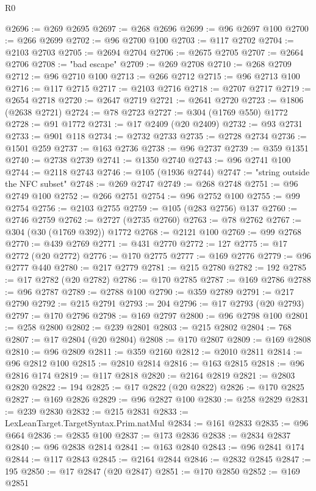 \begin{lexlean}{R0}
\begin{coremodule}
@2696 := @269 @2695
@2697 := @268 @2696
@2699 := @96 @2697 @100
@2700 := @266 @2699
@2702 := @96 @2700 @100
@2703 := @117 @2702
@2704 := @2103 @2703
@2705 := @2694 @2704
@2706 := @2675 @2705
@2707 := @2664 @2706
@2708 := "bad escape"
@2709 := @269 @2708
@2710 := @268 @2709
@2712 := @96 @2710 @100
@2713 := @266 @2712
@2715 := @96 @2713 @100
@2716 := @117 @2715
@2717 := @2103 @2716
@2718 := @2707 @2717
@2719 := @2654 @2718
@2720 := @2647 @2719
@2721 := @2641 @2720
@2723 := @1806 (@2638 @2721)
@2724 := @78 @2723
@2727 := @304 (@1769 @550) @1772
@2728 := @91 @1772
@2731 := @17 @2409 (@20 @2409)
@2732 := @93 @2731
@2733 := @901 @118
@2734 := @2732 @2733
@2735 := @2728 @2734
@2736 := @1501 @259
@2737 := @163 @2736
@2738 := @96 @2737
@2739 := @359 @1351
@2740 := @2738 @2739
@2741 := @1350 @2740
@2743 := @96 @2741 @100
@2744 := @2118 @2743
@2746 := @105 (@1936 @2744)
@2747 := "string outside the NFC subset"
@2748 := @269 @2747
@2749 := @268 @2748
@2751 := @96 @2749 @100
@2752 := @266 @2751
@2754 := @96 @2752 @100
@2755 := @99 @2754
@2756 := @2103 @2755
@2759 := @105 (@283 @2756) @137
@2760 := @2746 @2759
@2762 := @2727 (@2735 @2760)
@2763 := @78 @2762
@2767 := @304 (@30 (@1769 @392)) @1772
@2768 := @2121 @100
@2769 := @99 @2768
@2770 := @439 @2769
@2771 := @431 @2770
@2772 := 127
@2775 := @17 @2772 (@20 @2772)
@2776 := @170 @2775
@2777 := @169 @2776
@2779 := @96 @2777 @440
@2780 := @217 @2779
@2781 := @215 @2780
@2782 := 192
@2785 := @17 @2782 (@20 @2782)
@2786 := @170 @2785
@2787 := @169 @2786
@2788 := @96 @2787
@2789 := @2788 @100
@2790 := @359 @2789
@2791 := @217 @2790
@2792 := @215 @2791
@2793 := 204
@2796 := @17 @2793 (@20 @2793)
@2797 := @170 @2796
@2798 := @169 @2797
@2800 := @96 @2798 @100
@2801 := @258 @2800
@2802 := @239 @2801
@2803 := @215 @2802
@2804 := 768
@2807 := @17 @2804 (@20 @2804)
@2808 := @170 @2807
@2809 := @169 @2808
@2810 := @96 @2809
@2811 := @359 @2160
@2812 := @2010 @2811
@2814 := @96 @2812 @100
@2815 := @2810 @2814
@2816 := @163 @2815
@2818 := @96 @2816 @174
@2819 := @117 @2818
@2820 := @2164 @2819
@2821 := @2803 @2820
@2822 := 194
@2825 := @17 @2822 (@20 @2822)
@2826 := @170 @2825
@2827 := @169 @2826
@2829 := @96 @2827 @100
@2830 := @258 @2829
@2831 := @239 @2830
@2832 := @215 @2831
@2833 := LexLeanTarget.TargetSyntax.Prim.natMul
@2834 := @161 @2833
@2835 := @96 @664
@2836 := @2835 @100
@2837 := @173 @2836
@2838 := @2834 @2837
@2840 := @96 @2838 @2814
@2841 := @163 @2840
@2843 := @96 @2841 @174
@2844 := @117 @2843
@2845 := @2164 @2844
@2846 := @2832 @2845
@2847 := 195
@2850 := @17 @2847 (@20 @2847)
@2851 := @170 @2850
@2852 := @169 @2851

\end{coremodule}
\end{lexlean}
